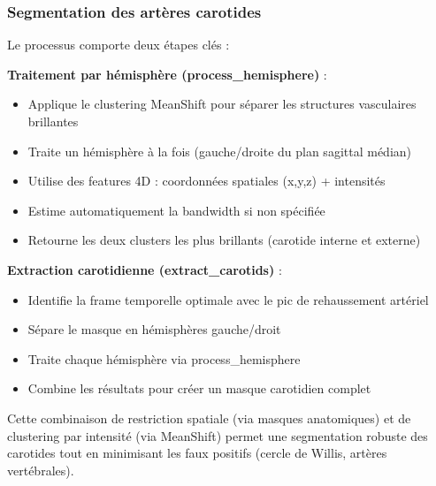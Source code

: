 \documentclass{article}
\begin{document}
            \subsubsection*{Segmentation des artères carotides}
                Le processus comporte deux étapes clés :

                \textbf{Traitement par hémisphère (process\_hemisphere)} :
                \begin{itemize}
                    \item Applique le clustering MeanShift pour séparer les structures vasculaires brillantes
                    \item Traite un hémisphère à la fois (gauche/droite du plan sagittal médian)
                    \item Utilise des features 4D : coordonnées spatiales (x,y,z) + intensités
                    \item Estime automatiquement la bandwidth si non spécifiée
                    \item Retourne les deux clusters les plus brillants (carotide interne et externe)
                \end{itemize}
                
                \vspace{1em} 
                \hspace{0em}\textbf{Extraction carotidienne (extract\_carotids)} :
                \begin{itemize}
                    \item Identifie la frame temporelle optimale avec le pic de rehaussement artériel
                    \item Sépare le masque en hémisphères gauche/droit
                    \item Traite chaque hémisphère via process\_hemisphere
                    \item Combine les résultats pour créer un masque carotidien complet
                \end{itemize}

            Cette combinaison de restriction spatiale (via masques anatomiques) et de clustering par intensité (via MeanShift) permet une segmentation robuste des carotides tout en minimisant les faux positifs (cercle de Willis, artères vertébrales).
\end{document}
